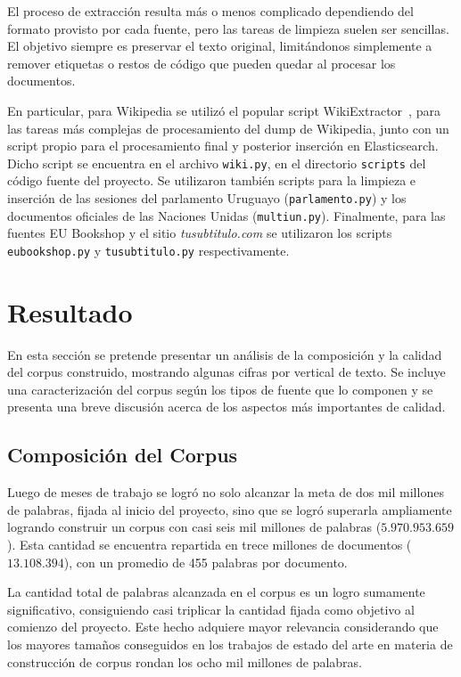 El proceso de extracción resulta más o menos complicado dependiendo del formato provisto por cada
fuente, pero las tareas de limpieza suelen ser sencillas. El objetivo siempre es preservar el texto
original, limitándonos simplemente a remover etiquetas o restos de código que pueden quedar al
procesar los documentos.

En particular, para Wikipedia se utilizó el popular script WikiExtractor~\cite{WikiExtractor}, para las
tareas más complejas de procesamiento del dump de Wikipedia, junto con un script propio para el procesamiento
final y posterior inserción en Elasticsearch. Dicho script se encuentra en el archivo \texttt{wiki.py},
en el directorio \texttt{scripts} del código fuente del proyecto. Se utilizaron también scripts para la
limpieza e inserción de las sesiones del parlamento Uruguayo (\texttt{parlamento.py}) y los documentos
oficiales de las Naciones Unidas (\texttt{multiun.py}). Finalmente, para las fuentes EU Bookshop y el
sitio \textit{tusubtitulo.com} se utilizaron los scripts \texttt{eubookshop.py} y \texttt{tusubtitulo.py}
respectivamente.


\section{Resultado}

En esta sección se pretende presentar un análisis de la composición y la calidad del corpus
construido, mostrando algunas cifras por vertical de texto. Se incluye una caracterización del
corpus según los tipos de fuente que lo componen y se presenta una breve discusión acerca de los
aspectos más importantes de calidad.


\subsection{Composición del Corpus}

Luego de meses de trabajo se logró no solo alcanzar la meta de dos mil millones de palabras,
fijada al inicio del proyecto, sino que se logró superarla ampliamente logrando construir un
corpus con casi seis mil millones de palabras ($5.970.953.659$). Esta cantidad se encuentra
repartida en trece millones de documentos ($13.108.394$), con un promedio de 455 palabras
por documento.

La cantidad total de palabras alcanzada en el corpus es un logro sumamente significativo,
consiguiendo casi triplicar la cantidad fijada como objetivo al comienzo del proyecto. Este hecho
adquiere mayor relevancia considerando que los mayores tamaños conseguidos en los
trabajos de estado del arte en materia de construcción de corpus rondan los ocho mil
millones de palabras.

